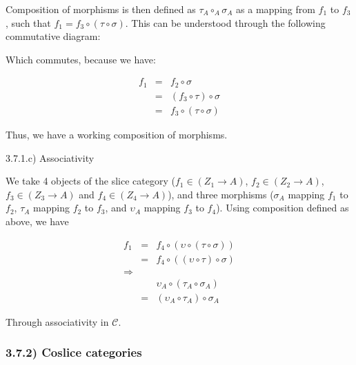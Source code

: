 \documentclass[12pt, letterpaper, twoside]{report}
\begin{document}
Composition of morphisms is then defined as $\tau_A \circ_A \sigma_A$ as a mapping from $f_1$ to $f_3$, such that $f_1 = f_3 \circ (\tau \circ \sigma)$. This can be understood through the following commutative diagram:


Which commutes, because we have:

$$
\begin{aligned}
	f_1 &=&  f_2              \circ \sigma  \\
		&=& (f_3 \circ  \tau) \circ \sigma  \\
		&=&  f_3 \circ (\tau  \circ \sigma)
\end{aligned}
$$

Thus, we have a working composition of morphisms.

3.7.1.c) Associativity

We take 4 objects of the slice category ($f_1 \in (Z_1 \to A)$, $f_2 \in (Z_2 \to A)$, $f_3 \in (Z_3 \to A)$ and  $f_4 \in (Z_4 \to A)$), and three morphisms ($\sigma_A$ mapping $f_1$ to $f_2$, $\tau_A$ mapping $f_2$ to $f_3$, and $\upsilon_A$ mapping $f_3$ to $f_4$). Using composition defined as above, we have

$$
\begin{aligned}
f_1 &=& f_4 \circ ( \upsilon \circ (\tau  \circ \sigma)) \\
    &=& f_4 \circ ((\upsilon \circ  \tau) \circ \sigma ) \\
\Rightarrow && \\
& &  \upsilon_A \circ (\tau_A  \circ \sigma_A) \\
&=& (\upsilon_A \circ  \tau_A) \circ \sigma_A
\end{aligned}
$$

Through associativity in $\mathcal{C}$.


\subsubsection*{3.7.2) Coslice categories}
\end{document}
